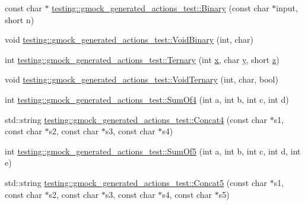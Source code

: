 \begin{DoxyCompactItemize}
\item 
const char $\ast$ \mbox{\hyperlink{namespacetesting_1_1gmock__generated__actions__test_ac5e6c89b4c4832bd3db18173c40c55ad}{testing\+::gmock\+\_\+generated\+\_\+actions\+\_\+test\+::\+Binary}} (const char $\ast$input, short n)
\item 
void \mbox{\hyperlink{namespacetesting_1_1gmock__generated__actions__test_af957302d6c2b4dacd31385f2a34b529f}{testing\+::gmock\+\_\+generated\+\_\+actions\+\_\+test\+::\+Void\+Binary}} (int, char)
\item 
int \mbox{\hyperlink{namespacetesting_1_1gmock__generated__actions__test_a1b234626e33284c4159ea666d240d5ed}{testing\+::gmock\+\_\+generated\+\_\+actions\+\_\+test\+::\+Ternary}} (int \mbox{\hyperlink{_obj__test_2lib_2googletest-master_2googlemock_2test_2gmock-matchers__test_8cc_a6150e0515f7202e2fb518f7206ed97dc}{x}}, char \mbox{\hyperlink{_obj__test_2lib_2googletest-master_2googlemock_2test_2gmock-matchers__test_8cc_a39cb44155237f0205e0feb931d5acbed}{y}}, short \mbox{\hyperlink{_obj__test_2lib_2googletest-master_2googlemock_2test_2gmock-matchers__test_8cc_a196ff6a287f53f758b1506f21269fc77}{z}})
\item 
void \mbox{\hyperlink{namespacetesting_1_1gmock__generated__actions__test_a7b1b519421c70b90ea3c818d4cf565ac}{testing\+::gmock\+\_\+generated\+\_\+actions\+\_\+test\+::\+Void\+Ternary}} (int, char, bool)
\item 
int \mbox{\hyperlink{namespacetesting_1_1gmock__generated__actions__test_a2a5879c060adacf27c3528260172a7be}{testing\+::gmock\+\_\+generated\+\_\+actions\+\_\+test\+::\+Sum\+Of4}} (int a, int b, int c, int d)
\item 
std\+::string \mbox{\hyperlink{namespacetesting_1_1gmock__generated__actions__test_aab6acb97e71142752555bec85fa80d28}{testing\+::gmock\+\_\+generated\+\_\+actions\+\_\+test\+::\+Concat4}} (const char $\ast$s1, const char $\ast$s2, const char $\ast$s3, const char $\ast$s4)
\item 
int \mbox{\hyperlink{namespacetesting_1_1gmock__generated__actions__test_a7ebfbfdf11d92d4f99df6b659c371e74}{testing\+::gmock\+\_\+generated\+\_\+actions\+\_\+test\+::\+Sum\+Of5}} (int a, int b, int c, int d, int e)
\item 
std\+::string \mbox{\hyperlink{namespacetesting_1_1gmock__generated__actions__test_a5eb28d383a654ddc97e16496753c9e45}{testing\+::gmock\+\_\+generated\+\_\+actions\+\_\+test\+::\+Concat5}} (const char $\ast$s1, const char $\ast$s2, const char $\ast$s3, const char $\ast$s4, const char $\ast$s5)
\item 

\end{DoxyCompactItemize}
